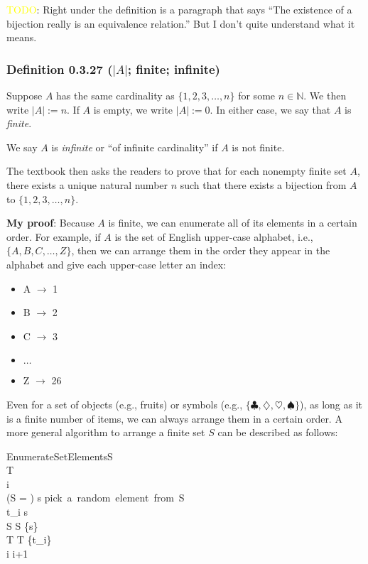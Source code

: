 \documentclass[12pt, letterpaper, oneside]{book}
\begin{document}
\colorbox{red!100}{\textcolor{yellow}{TODO}}: Right under the definition is a
paragraph that says ``The existence of a bijection really is an equivalence
relation.'' But I don't quite understand what it means.

\subsubsection{Definition 0.3.27 ($|A|$; finite; infinite)}

Suppose $A$ has the same cardinality as $\{1, 2, 3, \ldots , n\}$ for some $n
\in \mathbb{N}$. We then write $|A|:= n$. If $A$ is empty, we write $|A|:= 0$.
In either case, we say that $A$ is \textit{finite}.

We say $A$ is \textit{infinite} or ``of infinite cardinality'' if $A$ is not
finite.

The textbook then asks the readers to prove that for each nonempty finite set
$A$, there exists a unique natural number $n$ such that there exists a bijection
from $A$ to $\{1, 2, 3, \ldots, n\}$.

\colorbox{lime!100}{\textbf{My proof}}: Because $A$ is finite, we can enumerate
all of its elements in a certain order. For example, if $A$ is the set of
English upper-case alphabet, i.e., $\{A, B, C, \ldots, Z\}$, then we can arrange
them in the order they appear in the alphabet and give each upper-case letter an
index:
\begin{itemize}
  \item A $\rightarrow$ 1
  \item B $\rightarrow$ 2
  \item C $\rightarrow$ 3
  \item $\ldots$
  \item Z $\rightarrow$ 26
\end{itemize}

Even for a set of objects (e.g., fruits) or symbols (e.g., $\{\clubsuit,
\diamondsuit, \heartsuit, \spadesuit \}$), as long as it is a finite number of
items, we can always arrange them in a certain order. A more general algorithm
to arrange a finite set $S$ can be described as follows:

\begin{pseudocode}[ruled]{EnumerateSetElements}{S}
   \\
  T \GETS \emptyset \\
  i  \\
  \WHILE \NOT (S = \emptyset) \DO
    \BEGIN
      s \GETS \mbox{pick a random element from S} \\
      t_i \GETS s \\
      S \GETS S \setminus \{s\} \\
      T \GETS T \cup \{t_i\} \\
      i \GETS i+1
    \END \\
\end{pseudocode}
\end{document}
